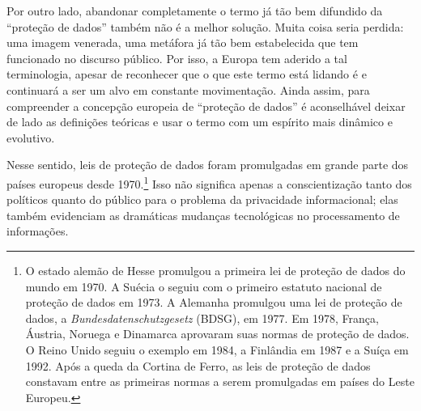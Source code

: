 Por outro lado, abandonar completamente o termo já tão bem difundido da
``proteção de dados'' também não é a melhor solução. Muita coisa seria
perdida: uma imagem venerada, uma metáfora já tão bem estabelecida que
tem funcionado no discurso público. Por isso, a Europa tem aderido a tal
terminologia, apesar de reconhecer que o que este termo está lidando é e
continuará a ser um alvo em constante movimentação. Ainda assim, para
compreender a concepção europeia de ``proteção de dados'' é aconselhável
deixar de lado as definições teóricas e usar o termo com um espírito
mais dinâmico e evolutivo.

Nesse sentido, leis de proteção de dados foram promulgadas em grande
parte dos países europeus desde 1970.\footnote{O estado alemão de Hesse
  promulgou a primeira lei de proteção de dados do mundo em 1970. A
  Suécia o seguiu com o primeiro estatuto nacional de proteção de dados
  em 1973. A Alemanha promulgou uma lei de proteção de dados, a
  \emph{Bundesdatenschutzgesetz} (BDSG), em 1977. Em 1978, França,
  Áustria, Noruega e Dinamarca aprovaram suas normas de proteção de
  dados. O Reino Unido seguiu o exemplo em 1984, a Finlândia em 1987 e a
  Suíça em 1992. Após a queda da Cortina de Ferro, as leis de proteção
  de dados constavam entre as primeiras normas a serem promulgadas em
  países do Leste Europeu.} Isso não significa apenas a conscientização
tanto dos políticos quanto do público para o problema da privacidade
informacional; elas também evidenciam as dramáticas mudanças
tecnológicas no processamento de informações.

